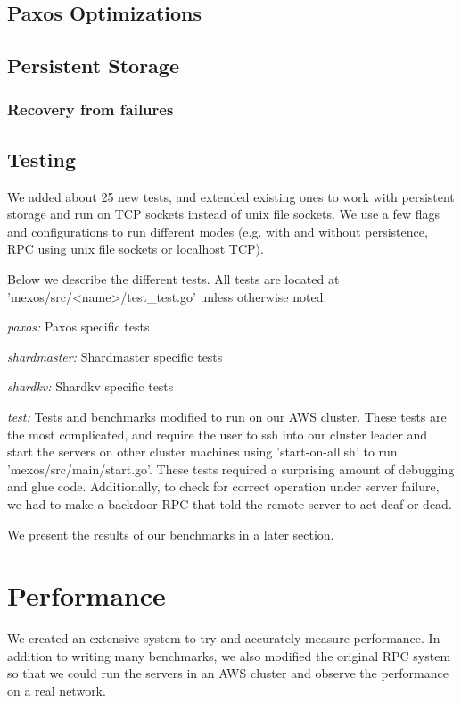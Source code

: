 \documentclass[letterpaper,10pt]{article}
\begin{document}
\subsection{Paxos Optimizations}

\subsection{Persistent Storage}

\subsubsection{Recovery from failures}

\subsection{Testing}
We added about 25 new tests, and extended existing ones to work with
persistent storage and run on TCP sockets instead of unix file
sockets. We use a few flags and configurations to run different modes
(e.g. with and without persistence, RPC using unix file sockets or
localhost TCP).

Below we describe the different tests. All tests are located at
'mexos/src/<name>/test_test.go' unless otherwise noted.

\emph{paxos:} Paxos specific tests

\emph{shardmaster:} Shardmaster specific tests

\emph{shardkv:} Shardkv specific tests

\emph{test:} Tests and benchmarks modified to run on our AWS
cluster. These tests are the most complicated, and require the user to
ssh into our cluster leader and start the servers on other cluster
machines using 'start-on-all.sh' to run
'mexos/src/main/start.go'. These tests required a surprising amount of
debugging and glue code. Additionally, to check for correct operation
under server failure, we had to make a backdoor RPC that told the
remote server to act deaf or dead.

We present the results of our benchmarks in a later section.

\section{Performance}

We created an extensive system to try and accurately measure
performance. In addition to writing many benchmarks, we also modified
the original RPC system so that we could run the servers in an AWS
cluster and observe the performance on a real network.
\end{document}

